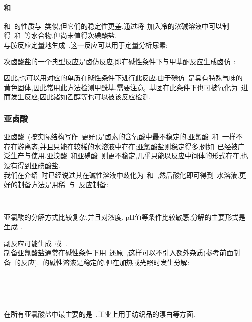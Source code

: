 \documentclass{ctexbook}
\begin{document}
\paragraph{和~}
和~的性质与~类似,但它们的稳定性更差.通过将~加入冷的浓碱溶液中可以制得~和~等水合物,但尚未值得次碘酸盐.\\
\indent {}与胺反应定量地生成~,这一反应可以用于定量分析尿素:
\begin{tightcenter}
\end{tightcenter}
\indent 次卤酸盐的一个典型反应是卤仿反应,即在碱性条件下与甲基酮反应生成卤仿~:
\begin{tightcenter}
\end{tightcenter}
因此,也可以用对应的单质在碱性条件下进行此反应.由于碘仿~是具有特殊气味的黄色固体,因此常用此方法检测甲酰基.需要注意,~基团在此条件下也可被氧化为~进而发生反应,因此诸如乙醇等也可以被该反应检测.
\subsubsection{亚卤酸~}
亚卤酸~(按实际结构写作~更好)是卤素的含氧酸中最不稳定的.亚氯酸~和~一样不存在游离态,并且只能在较稀的水溶液中存在;亚氯酸盐则稳定得多,例如~已经被广泛生产与使用.亚溴酸~和亚碘酸~则更不稳定,几乎只能以反应中间体的形式存在,也没有得到亚碘酸盐.\\
\indent 我们在介绍~时已经说过其在碱性溶液中歧化为~和~,然后酸化即可得到~水溶液.更好的制备方法是用稀~与~反应制备:
\begin{tightcenter}
    \\
\end{tightcenter}
\indent 亚氯酸的分解方式比较复杂,并且对浓度, pH值等条件比较敏感.分解的主要形式是生成~:
\begin{tightcenter}
\end{tightcenter}
副反应可能生成~或~.\\
\indent 制备亚氯酸盐通常在碱性条件下用~还原~,这样可以不引入额外杂质(参考前面制备~的反应).~的碱性溶液是稳定的,但在加热或光照时发生分解:
\begin{tightcenter}
    \\
    \\
    \\
\end{tightcenter}
在所有亚氯酸盐中最主要的是~,工业上用于纺织品的漂白等方面.
\end{document}
